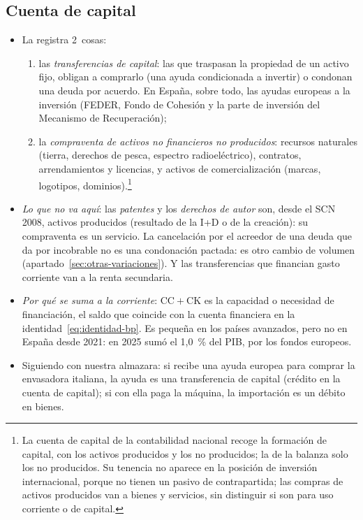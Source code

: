 \documentclass[11pt]{article}
\begin{document}
\subsection{Cuenta de capital}\label{sec:cuenta-capital}

\begin{itemize}
\item La  registra 2~cosas\nocite{FMI2009MBP6}:
  \begin{enumerate}
  \item las \emph{transferencias de capital}: las que traspasan la propiedad de un activo fijo, obligan a comprarlo (una ayuda condicionada a invertir) o condonan una deuda por acuerdo. En España, sobre todo, las ayudas europeas a la inversión (FEDER, Fondo de Cohesión y la parte de inversión del Mecanismo de Recuperación);
  \item la \emph{compraventa de activos no financieros no producidos}: recursos naturales (tierra, derechos de pesca, espectro radioeléctrico), contratos, arrendamientos y licencias, y activos de comercialización (marcas, logotipos, dominios).\footnote{La cuenta de capital de la contabilidad nacional recoge la formación de capital, con los activos producidos y los no producidos; la de la balanza solo los no producidos. Su tenencia no aparece en la posición de inversión internacional, porque no tienen un pasivo de contrapartida; las compras de activos producidos van a bienes y servicios, sin distinguir si son para uso corriente o de capital.}
  \end{enumerate}
\item \emph{Lo que no va aquí}: las \emph{patentes} y los \emph{derechos de autor} son, desde el SCN 2008, activos producidos (resultado de la I+D o de la creación): su compraventa es un servicio. La cancelación por el acreedor de una deuda que da por incobrable no es una condonación pactada: es otro cambio de volumen (apartado~\ref{sec:otras-variaciones}). Y las transferencias que financian gasto corriente van a la renta secundaria.
\item \emph{Por qué se suma a la corriente}: $\mathrm{CC}+\mathrm{CK}$ es la capacidad o necesidad de financiación, el saldo que coincide con la cuenta financiera en la identidad~\eqref{eq:identidad-bp}. Es pequeña en los países avanzados, pero no en España desde 2021: en 2025 sumó el 1,0~\% del PIB, por los fondos europeos\nocite{BdE2026BE17}.
\item Siguiendo con nuestra almazara: si recibe una ayuda europea para comprar la envasadora italiana, la ayuda es una transferencia de capital (crédito en la cuenta de capital); si con ella paga la máquina, la importación es un débito en bienes.
\end{itemize}
\end{document}
